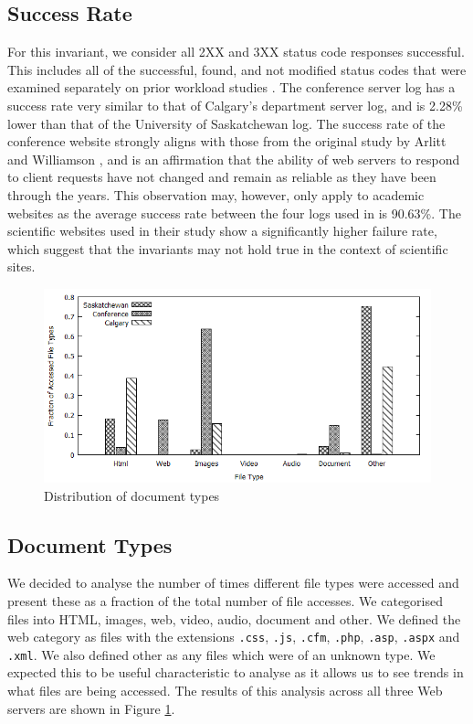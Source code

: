 \documentclass[10pt,conference]{IEEEtran}
\begin{document}
\subsection{Success Rate} %
\label{sub:success_rate}
For this invariant, we consider all 2XX and 3XX status code responses successful. This includes all of the successful, found, and not modified status codes that were examined separately on prior workload studies \cite{keynote, Faber}. The conference server log has a success rate very similar to that of Calgary's department server log, and is 2.28\% lower than that of the University of Saskatchewan log. The success rate of the conference website strongly aligns with those from the original study by Arlitt and Williamson \cite{keynote}, and is an affirmation that the ability of web servers to respond to client requests have not changed and remain as reliable as they have been through the years. This observation may, however, only apply to academic websites as the average success rate between the four logs used in \cite{keynote, Faber} is 90.63\%. The scientific websites used in their study show a significantly higher failure rate, which suggest that the invariants may not hold true in the context of scientific sites.

\begin{figure}
    \includegraphics{images/filetype}
    \caption{Distribution of document types}\label{fig:file_types}
\end{figure}

\subsection{Document Types}\label{sub:doc_types}
We decided to analyse the number of times different file types were accessed and present these as a fraction of the total number of file accesses. We categorised files into HTML, images, web, video, audio, document and other. We defined the web category as files with the extensions \texttt{.css}, \texttt{.js}, \texttt{.cfm}, \texttt{.php}, \texttt{.asp}, \texttt{.aspx} and \texttt{.xml}. We also defined other as any files which were of an unknown type. We expected this to be useful characteristic to analyse as it allows us to see trends in what files are being accessed. The results of this analysis across all three Web servers are shown in Figure \ref{fig:file_types}.
\end{document}
